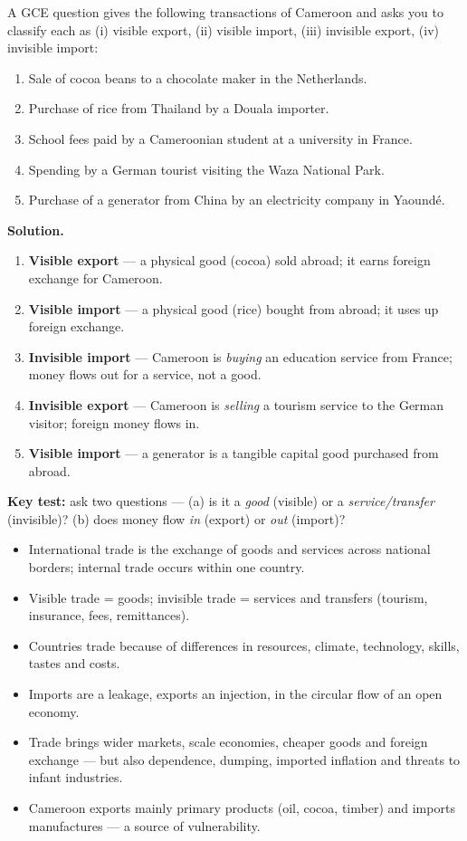 \documentclass[11pt]{article}
\begin{document}
\begin{exoresolu}
A GCE question gives the following transactions of Cameroon and asks you to classify each as (i) visible export, (ii) visible import, (iii) invisible export, (iv) invisible import:
\begin{enumerate}
\item Sale of cocoa beans to a chocolate maker in the Netherlands.
\item Purchase of rice from Thailand by a Douala importer.
\item School fees paid by a Cameroonian student at a university in France.
\item Spending by a German tourist visiting the Waza National Park.
\item Purchase of a generator from China by an electricity company in Yaoundé.
\end{enumerate}
\tcblower
\textbf{Solution.}
\begin{enumerate}
\item \textbf{Visible export} --- a physical good (cocoa) sold abroad; it earns foreign exchange for Cameroon.
\item \textbf{Visible import} --- a physical good (rice) bought from abroad; it uses up foreign exchange.
\item \textbf{Invisible import} --- Cameroon is \emph{buying} an education service from France; money flows out for a service, not a good.
\item \textbf{Invisible export} --- Cameroon is \emph{selling} a tourism service to the German visitor; foreign money flows in.
\item \textbf{Visible import} --- a generator is a tangible capital good purchased from abroad.
\end{enumerate}
\textbf{Key test:} ask two questions --- (a) is it a \emph{good} (visible) or a \emph{service/transfer} (invisible)? (b) does money flow \emph{in} (export) or \emph{out} (import)?
\end{exoresolu}

\begin{aretenir}
\begin{itemize}
\item International trade is the exchange of goods and services across national borders; internal trade occurs within one country.
\item Visible trade = goods; invisible trade = services and transfers (tourism, insurance, fees, remittances).
\item Countries trade because of differences in resources, climate, technology, skills, tastes and costs.
\item Imports are a leakage, exports an injection, in the circular flow of an open economy.
\item Trade brings wider markets, scale economies, cheaper goods and foreign exchange --- but also dependence, dumping, imported inflation and threats to infant industries.
\item Cameroon exports mainly primary products (oil, cocoa, timber) and imports manufactures --- a source of vulnerability.
\end{itemize}
\end{aretenir}
\end{document}
